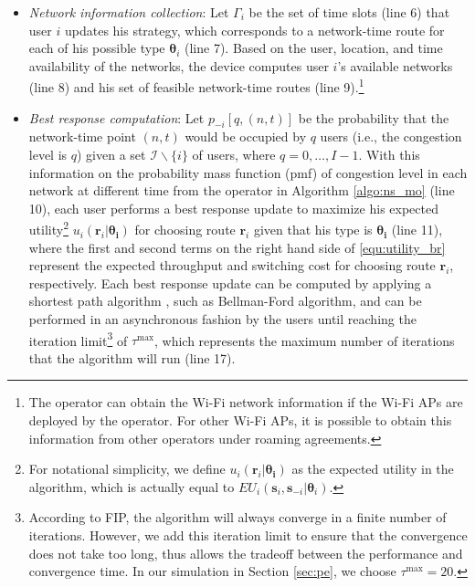 \documentclass[journal]{IEEEtran}
\newcommand{\mc}[1]{\mathcal{#1}}
\newcommand{\bs}[1]{\boldsymbol{#1}}
\begin{document}
\begin{itemize}
	\item \emph{Network information collection}:
	Let $\Gamma_i$ be the set of time slots (line 6) that user $i$ updates his strategy, which corresponds to a network-time route for each of his possible type $\bs{\theta}_i$ (line 7).
	Based on the user, location, and time availability of the networks, the device computes user $i$'s available networks (line 8) and his set of feasible network-time routes (line 9).\footnote{The operator can obtain the Wi-Fi network information if the Wi-Fi APs are deployed by the operator. For other Wi-Fi APs, it is possible to obtain this information from other operators under roaming agreements.}
	
	\item \emph{Best response computation}: Let $p_{-i}[q,(n,t)]$ be the probability that the network-time point $(n,t)$ would be occupied by $q$ users (i.e., the congestion level is $q$) given a set $\mc{I} \backslash \{i\}$ of users, where $q = 0, \ldots, I-1$.
	With this information on the probability mass function (pmf) of congestion level in each network at different time from the operator in Algorithm \ref{algo:ns_mo} (line 10), each user performs a best response update to maximize his expected utility\footnote{For notational simplicity, we define $u_i(\boldsymbol{r}_i|\boldsymbol{\theta_i})$ as the expected utility in the algorithm, which is actually equal to $EU_i(\bs{s}_i, \bs{s}_{-i}|\bs{\theta}_i)$.} $u_i(\boldsymbol{r}_i|\boldsymbol{\theta_i})$ for choosing route $\bs{r}_i$ given that his type is $\bs{\theta_i}$ (line 11), where the first and second terms on the right hand side of \eqref{equ:utility_br} represent the expected throughput and switching cost for choosing route $\bs{r}_i$, respectively.
  Each best response update can be computed by applying a shortest path algorithm \cite{weiss_ds97}, such as Bellman-Ford algorithm, and can be performed in an asynchronous fashion by the users until reaching the iteration limit\footnote{According to FIP, the algorithm will always converge in a finite number of iterations. However, we add this iteration limit to ensure that the convergence does not take too long, thus allows the tradeoff between the performance and convergence time. In our simulation in Section \ref{sec:pe}, we choose $\tau^{\text{max}} = 20$.} of $\tau^{\text{max}}$, which represents the maximum number of iterations that the algorithm will run (line 17).
	

\end{itemize}
\end{document}
